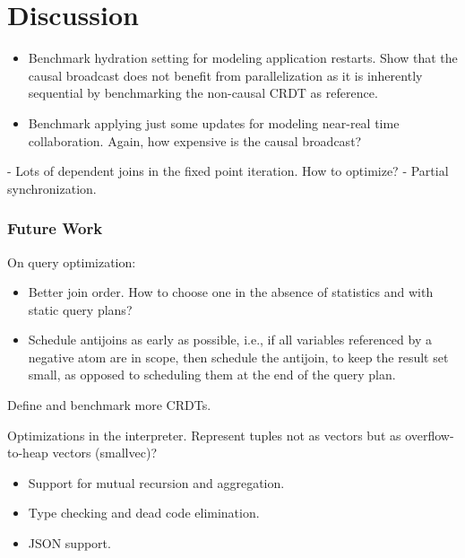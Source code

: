 
\chapter{Discussion}\label{ch:discussion}

\begin{itemize}
	\item Benchmark hydration setting for modeling application restarts.
	      Show that the causal broadcast does not benefit from parallelization
	      as it is inherently sequential by benchmarking the non-causal CRDT
	      as reference.
	\item Benchmark applying just some updates for modeling near-real time collaboration.
	      Again, how expensive is the causal broadcast?
\end{itemize}

- Lots of dependent joins in the fixed point iteration. How to optimize?
- Partial synchronization.

\subsection{Future Work}

On query optimization:
\begin{itemize}
	\item Better join order. How to choose one in the absence of statistics
	      and with static query plans?
	\item Schedule antijoins as early as possible, i.e., if all variables
	      referenced by a negative atom are in scope, then schedule the antijoin,
	      to keep the result set small, as opposed to scheduling them at the
	      end of the query plan.
\end{itemize}

Define and benchmark more CRDTs.

Optimizations in the interpreter. Represent tuples not as vectors but
as overflow-to-heap vectors (smallvec)?

\begin{itemize}
	\item Support for mutual recursion and aggregation.
	\item Type checking and dead code elimination.
	\item JSON support.
\end{itemize}
